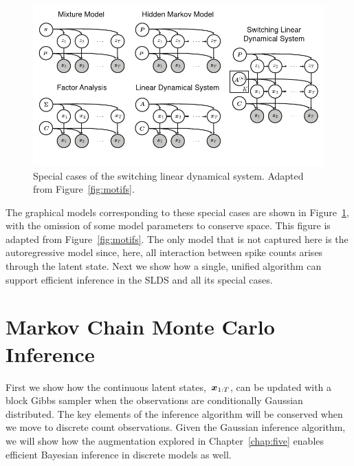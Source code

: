 \begin{figure}[t]
  \centering%
\includegraphics[width=5.5in]{figures/ch8/graphical_models} 
\vspace{-.25in}
\caption{Special cases of the switching linear dynamical system.
  Adapted from Figure~\ref{fig:motifs}.}
\label{fig:slds_models}
\end{figure}

The graphical models corresponding to these special cases are shown in
Figure~\ref{fig:slds_models}, with the omission of some model
parameters to conserve space. This figure is adapted from
Figure~\ref{fig:motifs}. The only model that is not captured here
is the autoregressive model since, here, all interaction between
spike counts arises through the latent state. Next we show how
a single, unified algorithm can support efficient
inference in the SLDS and all its special cases.


\section{Markov Chain Monte Carlo Inference}


First we show how the continuous latent states,~$\boldsymbol{x}_{1:T}$, can be
updated with a block Gibbs sampler when the observations are conditionally
Gaussian distributed.  The
key elements of the inference algorithm will be conserved when we move
to discrete count observations.  Given the Gaussian inference
algorithm, we will show how the \polyagamma augmentation explored in
Chapter~\ref{chap:five} enables efficient Bayesian
inference in discrete models as well.

